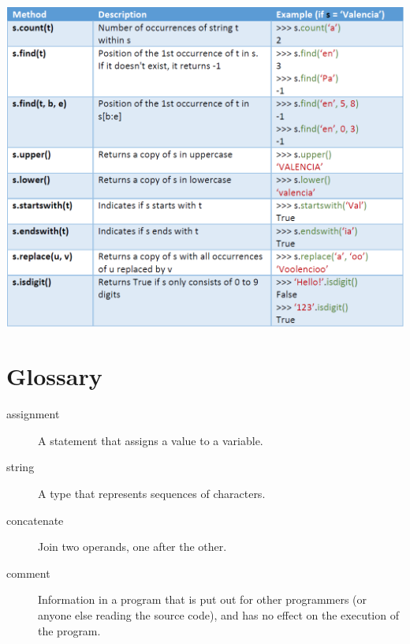 \includegraphics[width=\textwidth]{images/methods-string.png}


\hypertarget{glosario}{%
\section*{Glossary}\label{glosario}}

\begin{description}
\item[assignment]
A statement that assigns a value to a variable.
\end{description}


\begin{description}
\item[string]
A type that represents sequences of characters.
\end{description}


\begin{description}
\item[concatenate]
Join two operands, one after the other.
\end{description}


\begin{description}
\item[comment]
Information in a program that is put out for other programmers (or anyone else reading the source code), and has no effect on the execution of the program.
\end{description}

